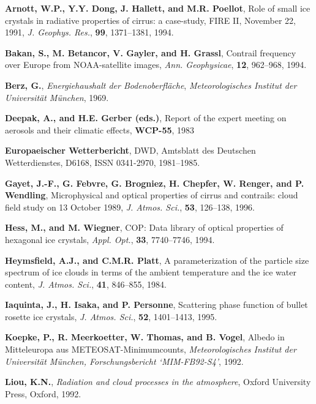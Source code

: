 \documentclass[agp]{svjour}
\begin{document}
\begin{thebibliography}{}

 {\bf Arnott, W.P., Y.Y. Dong, J.
Hallett, and M.R. Poellot}, Role of small ice crystals in radiative
properties of cirrus: a case-study, FIRE II, November 22, 1991, {\it J.
Geophys. Res.}, {\bf 99}, 1371--1381, 1994.

 {\bf Bakan, S., M. Betancor, V.
Gayler, and H. Grassl}, Contrail frequency over Europe from
NOAA-satellite images, {\it Ann. Geophysicae}, {\bf 12}, 962--968, 1994.

 {\bf Berz, G.}, {\it Energiehaushalt der
Bodenoberfl\"ache}, {\it Meteorologisches Institut der Universit\"at
M\"unchen}, 1969.

 {\bf Deepak, A., and H.E. Gerber
(eds.)}, Report of the expert meeting on aerosols and their climatic
effects, {\bf WCP-55}, 1983

 {\bf Europaeischer
Wetterbericht}, DWD, Amtsblatt des Deutschen Wetterdienstes, D6168, ISSN
0341-2970, 1981--1985.

 {\bf Gayet, J.-F., G. Febvre, G.
Brogniez, H. Chepfer, W. Renger, and P. Wendling}, Microphysical and
optical properties of cirrus and contrails: cloud field study on 13
October 1989, {\it J. Atmos. Sci.}, {\bf 53}, 126--138, 1996.

 {\bf Hess, M., and M. Wiegner},
COP: Data library of optical properties of hexagonal ice crystals, {\it
Appl. Opt.}, {\bf 33}, 7740--7746, 1994.

 {\bf Heymsfield, A.J., and
C.M.R. Platt}, A parameterization of the particle size spectrum of ice
clouds in terms of the ambient temperature and the ice water content,
{\it J. Atmos. Sci.}, {\bf 41}, 846--855, 1984.

 {\bf Iaquinta, J., H. Isaka, and P.
Personne}, Scattering phase function of bullet rosette ice crystals,
{\it J. Atmos. Sci.}, {\bf 52}, 1401--1413, 1995.

 {\bf Koepke, P., R. Meerkoetter, W. Thomas,
and B. Vogel}, Albedo in Mitteleuropa aus METEOSAT-Minimumcounts, {\it
Meteorologisches Institut der Universit\"at M\"unchen, Forschungsbericht
`MIM-FB92-S4'}, 1992.

 {\bf Liou, K.N.}, {\it Radiation and cloud
processes in the atmosphere}, Oxford University Press, Oxford, 1992.


\end{thebibliography}
\end{document}
